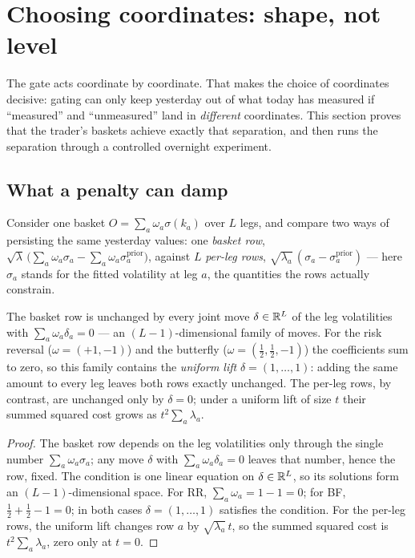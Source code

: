 \section{Choosing coordinates: shape, not level}
\label{sec:infcoords}

The gate acts coordinate by coordinate.  That makes the choice of
coordinates decisive: gating can only keep yesterday out of what
today has measured if ``measured'' and ``unmeasured'' land in
\emph{different} coordinates.  This section proves that the trader's
baskets achieve exactly that separation, and then runs the
separation through a controlled overnight experiment.

\subsection{What a penalty can damp}

Consider one basket $O=\sum_a\omega_a\sigma(k_a)$ over $L$ legs,
and compare two ways of persisting the same yesterday values: one
\emph{basket row},
$\sqrt{\lambda}\,\bigl(\sum_a\omega_a\sigma_a-\sum_a\omega_a
\sigma_a^{\mathrm{prior}}\bigr)$, against $L$ \emph{per-leg rows},
$\sqrt{\lambda_a}\,(\sigma_a-\sigma_a^{\mathrm{prior}})$ --- here
$\sigma_a$ stands for the fitted volatility at leg $a$, the
quantities the rows actually constrain.

\begin{proposition}
\label{prop:infnull}
The basket row is unchanged by every joint move
$\delta\in\mathbb{R}^L$ of the leg volatilities with
$\sum_a\omega_a\delta_a=0$ --- an $(L-1)$-dimensional family of
moves.  For the risk reversal ($\omega=(+1,-1)$) and the butterfly
($\omega=(\tfrac12,\tfrac12,-1)$) the coefficients sum to zero, so
this family contains the \emph{uniform lift} $\delta=(1,\dots,1)$:
adding the same amount to every leg leaves both rows exactly
unchanged.  The per-leg rows, by contrast, are unchanged only by
$\delta=0$; under a uniform lift of size $t$ their summed squared
cost grows as $t^2\sum_a\lambda_a$.
\end{proposition}

\begin{proof}
The basket row depends on the leg volatilities only through the
single number $\sum_a\omega_a\sigma_a$; any move $\delta$ with
$\sum_a\omega_a\delta_a=0$ leaves that number, hence the row, fixed.
The condition is one linear equation on $\delta\in\mathbb{R}^L$, so its
solutions form an $(L-1)$-dimensional space.  For RR,
$\sum_a\omega_a=1-1=0$; for BF,
$\tfrac12+\tfrac12-1=0$; in both cases $\delta=(1,\dots,1)$
satisfies the condition.  For the per-leg rows, the uniform lift
changes row $a$ by $\sqrt{\lambda_a}\,t$, so the summed squared cost
is $t^2\sum_a\lambda_a$, zero only at $t=0$.
\end{proof}

